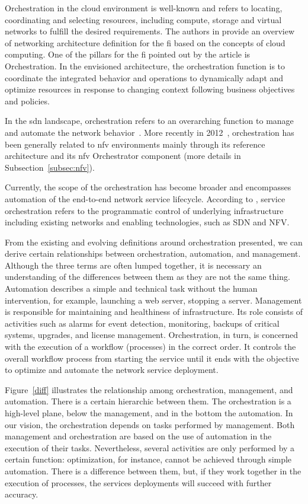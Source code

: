 Orchestration in the cloud environment is well-known and refers to locating, coordinating and selecting resources, including compute, storage and virtual networks to fulfill the desired requirements. The authors in \cite{Galis2009ManagementInternet} provide an overview of networking architecture definition for the \gls{fi} based on the concepts of cloud computing. One of the pillars for the \gls{fi} pointed out by the article is Orchestration. In the envisioned architecture, the orchestration function is to coordinate the integrated behavior and operations to dynamically adapt and optimize resources in response to changing context following business objectives and policies.

In the \gls{sdn} landscape, orchestration refers to an overarching function to manage and automate the network behavior~\cite{5984813}. 
 More recently in 2012~\cite{ETSI2012NetworkAction}, orchestration has been generally related to \gls{nfv} environments mainly through its reference architecture and its \gls{nfv} Orchestrator component (more details in Subsection~\ref{subsec:nfv}).  

Currently, the scope of the orchestration has become broader and encompasses automation of the end-to-end network service lifecycle. According to \cite{MEF:Third:2015}, service orchestration refers to the programmatic control of underlying infrastructure including existing networks and enabling technologies, such as SDN and NFV.

From the existing and evolving definitions around orchestration presented, we can derive certain relationships between orchestration, automation, and management. Although the three terms are often lumped together, it is necessary an understanding of the differences between them as they are not the same thing. Automation describes a simple and technical task without the human intervention, for example, launching a web server, stopping a server. Management is responsible for maintaining and healthiness of infrastructure. Its role consists of activities such as alarms for event detection, monitoring, backups of critical systems, upgrades, and license management. Orchestration, in turn, is concerned with the execution of a workflow (processes) in the correct order. It controls the overall workflow process from starting the service until it ends with the objective to optimize and automate the network service deployment. 

Figure~\ref{diff} illustrates the relationship among orchestration, management, and automation. There is a certain hierarchic between them. The orchestration is a high-level plane, below the management, and in the bottom the automation. In our vision, the orchestration depends on tasks performed by management. Both management and orchestration are based on the use of automation in the execution of their tasks. Nevertheless, several activities are only performed by a certain function: optimization, for instance, cannot be achieved through simple automation. There is a difference between them, but, if they work together in the execution of processes, the services deployments will succeed with further accuracy.

